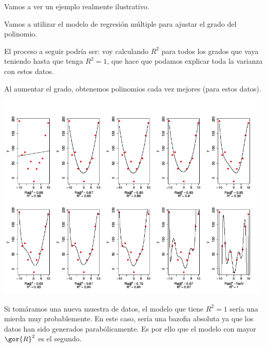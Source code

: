 Vamos a ver un ejemplo realmente ilustrativo.
\begin{example}

Vamos a utilizar el modelo de regresión múltiple para ajustar el grado del polinomio.

El proceso a seguir podría ser: voy calculando $R^2$ para todos los grados que vaya teniendo hasta que tenga $R^2 = 1$, que hace que podamos explicar toda la varianza con estos datos.


Al aumentar el grado, obtenemos polinomios cada vez mejores (para estos datos).

\begin{center}
\includegraphics[scale=0.45]{img/RvsRAdj.png}
\end{center}

Si tomáramos una nueva muestra de datos, el modelo que tiene $R^2=1$ sería una mierda muy probablemente. En este caso, sería una bazofia absoluta ya que los datos han sido generados parabólicamente. Es por ello que el modelo con mayor $\gor{R}^2$ es el segundo.

\end{example}



